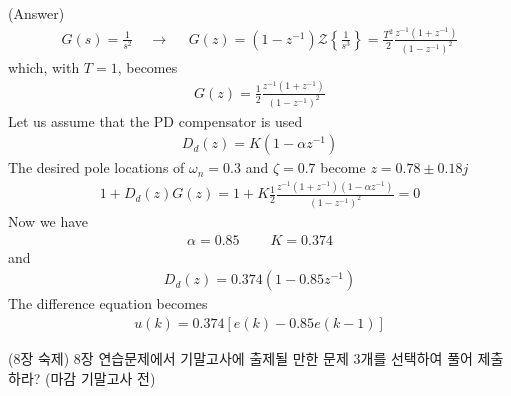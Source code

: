(Answer) 
\begin{align*}
	G(s) = \frac{1}{s^2}   ~~~~~\rightarrow~~~~~~ G(z) = (1-z^{-1}) \mathcal{Z} \left\{ \frac{1}{s^3} \right\} = \frac{T^2}{2} \frac{z^{-1}(1+z^{-1})}{(1-z^{-1})^2}
\end{align*}
which, with $T=1$, becomes
\begin{align*}
	G(z) = \frac{1}{2} \frac{z^{-1}(1+z^{-1})}{(1-z^{-1})^2}
\end{align*}
Let us assume that the PD compensator is used
\begin{align*}
	D_d(z) = K (1- \alpha z^{-1})
\end{align*}
The desired pole locations of $\omega_n = 0.3$ and $\zeta = 0.7$ become $z=0.78 \pm 0.18j$ 
\begin{align*}
	1 + D_d(z) G(z) = 1 + K\frac{1}{2} \frac{z^{-1}(1+z^{-1})(1- \alpha z^{-1})}{(1-z^{-1})^2} =0 
\end{align*}
Now we have 
\begin{align*}
	\alpha = 0.85 ~~~~~~~~~~K = 0.374
\end{align*}
and 
\begin{align*}
	D_d(z) = 0.374 (1- 0.85 z^{-1})
\end{align*}
The difference equation becomes
\begin{align*}
	u(k) =  0.374 [e(k) - 0.85 e(k-1)] 
\end{align*}

(8장 숙제) 8장 연습문제에서 기말고사에 출제될 만한 문제 3개를 선택하여 풀어 제출하라? (마감 기말고사 전) 
% 
\newpage
